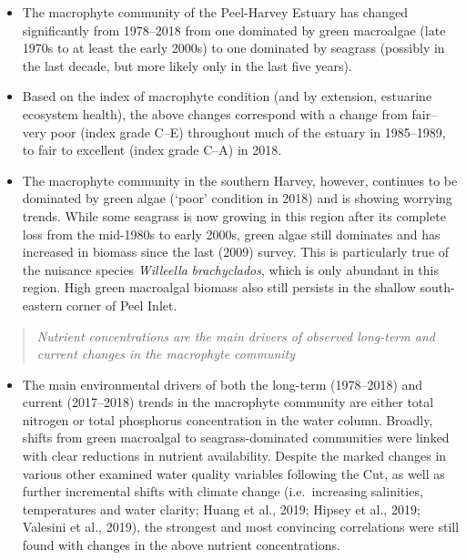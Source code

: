 \documentclass[
]{book}
\providecommand{\tightlist}{%
  \setlength{\itemsep}{0pt}\setlength{\parskip}{0pt}}
\begin{document}
\begin{itemize}
\item
  The macrophyte community of the Peel-Harvey Estuary has changed significantly from 1978--2018 from one dominated by green macroalgae (late 1970s to at least the early 2000s) to one dominated by seagrass (possibly in the last decade, but more likely only in the last five years).
\item
  Based on the index of macrophyte condition (and by extension, estuarine ecosystem health), the above changes correspond with a change from fair--very poor (index grade C--E) throughout much of the estuary in 1985--1989, to fair to excellent (index grade C--A) in 2018.
\item
  The macrophyte community in the southern Harvey, however, continues to be dominated by green algae (`poor' condition in 2018) and is showing worrying trends. While some seagrass is now growing in this region after its complete loss from the mid-1980s to early 2000s, green algae still dominates and has increased in biomass since the last (2009) survey. This is particularly true of the nuisance species \emph{Willeella} \emph{brachyclados}, which is only abundant in this region. High green macroalgal biomass also still persists in the shallow south-eastern corner of Peel Inlet.
\end{itemize}

\begin{quote}
\emph{Nutrient concentrations are the main drivers of observed long-term and current changes in the macrophyte community}
\end{quote}

\begin{itemize}
\tightlist
\item
  The main environmental drivers of both the long-term (1978--2018) and current (2017--2018) trends in the macrophyte community are either total nitrogen or total phosphorus concentration in the water column. Broadly, shifts from green macroalgal to seagrass-dominated communities were linked with clear reductions in nutrient availability. Despite the marked changes in various other examined water quality variables following the Cut, as well as further incremental shifts with climate change (i.e.~increasing salinities, temperatures and water clarity; Huang et al., 2019; Hipsey et al., 2019; Valesini et al., 2019), the strongest and most convincing correlations were still found with changes in the above nutrient concentrations.
\end{itemize}
\end{document}
